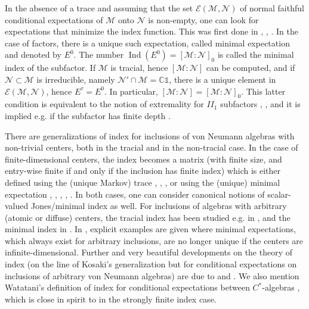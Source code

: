 \documentclass[11pt,a4paper]{article}
\makeatletter
\newcommand{\oneop}{\mathds{1}}
\newcommand{\E}{\mathcal{E}}
\newcommand{\M}{\mathcal{M}}
\newcommand{\N}{\mathcal{N}}
\newcommand{\CC}{\mathbb{C}}
\DeclareMathOperator{\Ind}{Ind}
\def\II{{I\!I}}%
\DeclareRobustCommand{\eg}{e.g.\@\xspace}
\newcommand{\Cstar}{$C^\ast$\@\xspace}
\theoremstyle{plain}
\theoremstyle{definition}
\theoremstyle{remark}
\numberwithin{equation}{section}%
\makeatother
\begin{document}
In the absence of a trace and assuming that the set $\E(\M,\N)$ of normal faithful conditional expectations of $\M$ onto $\N$ is non-empty, one can look for expectations that minimize the index function. This was first done in \cite{Hia88}, \cite{Lon89}, \cite{Hav90}.
In the case of factors, there is a unique such expectation, called minimal expectation and denoted by $E^0$. The number $\Ind(E^0) = [\M:\N]_0$ is called the minimal index of the subfactor. If $\M$ is tracial, hence $[\M:\N]$ can be computed, and if $\N\subset\M$ is irreducible, namely $\N'\cap\M = \CC\oneop$, there is a unique element in $\E(\M,\N)$, hence $E^\tau = E^0$. In particular, $[\M:\N] = [\M:\N]_0$. This latter condition is equivalent to the notion of extremality for $\II_1$ subfactors \cite{PiPo86}, \cite{PiPo91}, and it is implied \eg if the subfactor has finite depth \cite{Pop90}.

There are generalizations of index for inclusions of von Neumann algebras with non-trivial centers, both in the tracial and in the non-tracial case. In the case of finite-dimensional centers, the index becomes a matrix (with finite size, and entry-wise finite if and only if the inclusion has finite index) which is either defined using the (unique Markov) trace \cite{GHJ89}, \cite{Jol90}, \cite{BCEGP20}, or using the (unique) minimal expectation \cite{Ter92}, \cite{Hav90}, \cite{BDH14}, \cite{GiLo19}, \cite{Gio19}. In both cases, one can consider canonical notions of scalar-valued Jones/minimal index as well. For inclusions of algebras with arbitrary (atomic or diffuse) centers, the tracial index has been studied \eg in \cite{Jol90}, \cite{Jol91} and the minimal index in \cite{FiIs96}. In \cite{FiIs96}, explicit examples are given where minimal expectations, which always exist for arbitrary inclusions, are no longer unique if the centers are infinite-dimensional. Further and very beautiful developments on the theory of index (on the line of Kosaki's generalization \cite{Kos86} but for conditional expectations on inclusions of arbitrary von Neumann algebras) are due to \cite{BDH88} and \cite{PopBook}. We also mention Watatani's definition of index for conditional expectations between \Cstar-algebras \cite{Wat90}, which is close in spirit to \cite{BDH88} in the strongly finite index case.
\end{document}
